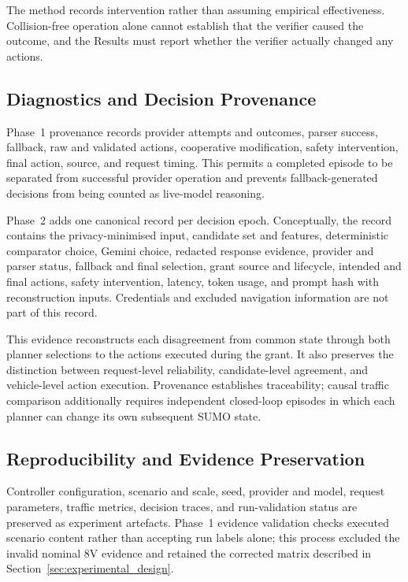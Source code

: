 \documentclass[letterpaper,10pt,conference]{ieeeconf}
\begin{document}
The method records intervention rather than assuming empirical effectiveness. Collision-free operation alone cannot establish that the verifier caused the outcome, and the Results must report whether the verifier actually changed any actions.



\subsection{Diagnostics and Decision Provenance}



Phase~1 provenance records provider attempts and outcomes, parser success, fallback, raw and validated actions, cooperative modification, safety intervention, final action, source, and request timing. This permits a completed episode to be separated from successful provider operation and prevents fallback-generated decisions from being counted as live-model reasoning.



Phase~2 adds one canonical record per decision epoch. Conceptually, the record contains the privacy-minimised input, candidate set and features, deterministic comparator choice, Gemini choice, redacted response evidence, provider and parser status, fallback and final selection, grant source and lifecycle, intended and final actions, safety intervention, latency, token usage, and prompt hash with reconstruction inputs. Credentials and excluded navigation information are not part of this record.



This evidence reconstructs each disagreement from common state through both planner selections to the actions executed during the grant. It also preserves the distinction between request-level reliability, candidate-level agreement, and vehicle-level action execution. Provenance establishes traceability; causal traffic comparison additionally requires independent closed-loop episodes in which each planner can change its own subsequent SUMO state.



\subsection{Reproducibility and Evidence Preservation}



Controller configuration, scenario and scale, seed, provider and model, request parameters, traffic metrics, decision traces, and run-validation status are preserved as experiment artefacts. Phase~1 evidence validation checks executed scenario content rather than accepting run labels alone; this process excluded the invalid nominal 8V evidence and retained the corrected matrix described in Section~\ref{sec:experimental_design}.
\end{document}

